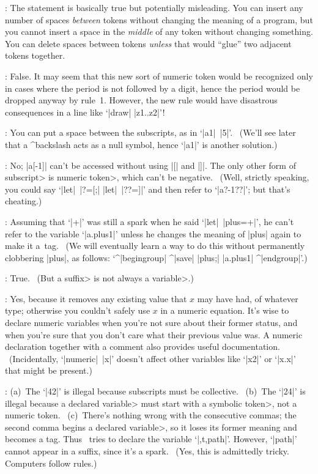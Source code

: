 :
 The statement is basically true but potentially misleading. You can
insert any number of spaces {\sl between\/} tokens without changing the
meaning of a program, but you cannot insert a space in the {\sl middle\/}
of any token without changing something. You can delete spaces between
tokens {\sl unless\/} that would ``glue'' two adjacent tokens together.

:
 False. It may seem that this new sort of numeric token would be
recognized only in cases where the period is not followed by a digit,
hence the period would be dropped anyway by rule~1. However, the new rule
would have disastrous consequences in a line like `|draw| |z1..z2|'!

:
 You can put a space between the subscripts, as in `|a1|~|5|'. \
(We'll see later that a ^{backslash} acts as a null symbol,
hence `|a1\5|' is another solution.)

:
 No; |a[-1]| can't be accessed without using |[| and |]|. The
only other form of \<subscript> is \<numeric token>, which can't be
negative. \ (Well, strictly speaking, you could say `|let|~|?=[;|
|let|~|??=]|' and then refer to `|a?-1??|'; but that's cheating.)

:
 Assuming that `|+|' was still a spark when he said `|let|~|plus=+|',
he can't refer to the variable `|a.plus1|' unless he changes the meaning of
|plus| again to make it a~tag. \ (We will eventually learn a way to do this
without permanently clobbering |plus|, as follows: `^|begingroup| ^|save|
|plus;| |a.plus1| ^|endgroup|'.)

:
 True. \ (But a \<suffix> is not always a \<variable>.)

:
 Yes, because it removes any existing value that $x$ may have
had, of whatever type; otherwise you couldn't safely use $x$ in a
numeric equation. It's wise to declare numeric variables when you're
not sure about their former status, and when you're sure that you don't
care what their previous value was. A numeric declaration together with a
comment also provides useful documentation. \ (Incidentally, `|numeric|~|x|'
doesn't affect other variables like `|x2|' or `|x.x|' that might be present.)

:
 (a)~The `|42|' is illegal because subscripts must be collective.
\ (b)~The `|24|' is illegal because a \<declared variable> must start with
a \<symbolic token>, not a numeric token. \ (c)~There's nothing wrong with
the consecutive commas; the second comma begins a \<declared variable>, so
it loses its former meaning and becomes a tag. Thus \MF\ tries to declare
the variable `|,t,path|'. However, `|path|' cannot appear in a suffix,
since it's a spark. \ (Yes, this is admittedly tricky. Computers follow rules.)

